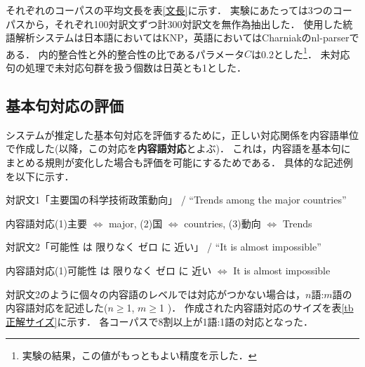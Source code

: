 それぞれのコーパスの平均文長を表\ref{文長}に示す．
実験にあたっては3つのコーパスから，それぞれ100対訳文ずつ計300対訳文を無作為抽出した．
使用した統語解析システムは日本語においてはKNP\cite{Kurohashi1994}，英語においてはCharniakのnl-parser\cite{Charniak2000}である．
内的整合性と外的整合性の比であるパラメータ$C$は0.2とした\footnote{実験の結果，この値がもっともよい精度を示した．}．
未対応句の処理で未対応句群を扱う個数は日英とも1とした．

\subsection{基本句対応の評価}

システムが推定した基本句対応を評価するために，正しい対応関係を内容語単位で作成した(以降，この対応を{\bf 内容語対応}とよぶ)．
これは，内容語を基本句にまとめる規則が変化した場合も評価を可能にするためである．
具体的な記述例を以下に示す．

\vspace{1ex}
\begin{description}

\item 対訳文1「主要国の科学技術政策動向」 / ``Trends among the major countries''
\item 内容語対応(1)主要  $\Leftrightarrow$ major, (2)国  $\Leftrightarrow$ countries, (3)動向  $\Leftrightarrow$ Trends

\vspace{1ex}
\vspace{1ex}

\item 対訳文2「可能性 は 限りなく ゼロ に 近い」 / ``It is almost impossible''
\item 内容語対応(1)可能性 は 限りなく ゼロ に 近い $\Leftrightarrow$ It is almost impossible

\end{description}
\vspace{1ex}
\vspace{1ex}

対訳文2のように個々の内容語のレベルでは対応がつかない場合は，$n$語:$m$語の内容語対応を記述した($n\geq$1, $m\geq$1 )．
作成された内容語対応のサイズを表\ref{tb正解サイズ}に示す．
各コーパスで8割以上が1語:1語の対応となった．


